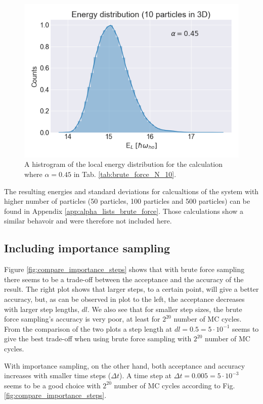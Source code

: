 \begin{figure}[H]
\center
\includegraphics[width=0.5\linewidth]{../Results/histogram_10p_3d_alpha_45}\caption{A histrogram of the local energy distribution for the calculation where $\alpha = 0.45$ in Tab. \ref{tab:brute_force_N_10}.}\label{fig:histogram}
\end{figure}

The resulting energies and standard deviations for calcualtions of the system with higher number of particles (50 particles, 100 particles and 500 particles) can be found in Appendix \ref{app:alpha_lists_brute_force}. Those calculations show a similar behavoir and were therefore not included here. 

\subsection{Including importance sampling}

Figure \ref{fig:compare_importance_steps} shows that with brute force sampling there seems to be a trade-off between the acceptance and the accuracy of the result. The right plot shows that larger steps, to a certain point, will give a better accuracy, but, as can be observed in plot to the left, the acceptance decreases with larger step lengths, $dl$. We also see that for smaller step sizes, the brute force sampling's accuracy is very poor, at least for $2^{20}$ number of MC cycles. From the comparison of the two plots a  step length at $dl = 0.5 = 5\cdot10^{-1}$ seems to give the best trade-off when using brute force sampling with $2^{20}$ number of MC cycles.

With importance sampling, on the other hand, both acceptance and accuracy increases with smaller time steps ($\Delta t$). A time step at $\Delta t = 0.005 = 5\cdot10^{-3}$ seems to be a good choice with $2^{20}$ number of MC cycles according to Fig. \ref{fig:compare_importance_steps}. 

